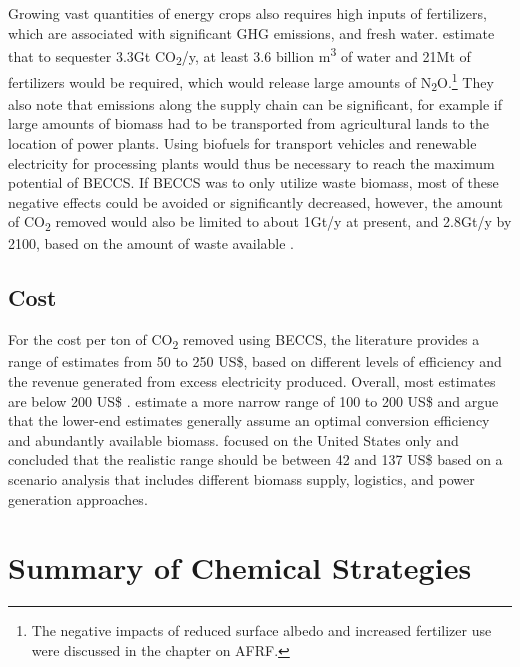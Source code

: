 Growing vast quantities of energy crops also requires high inputs of fertilizers, which are associated with significant GHG emissions, and fresh water. \textcite{Fajardy2017CanEmissions} estimate that to sequester 3.3Gt CO\textsubscript{2}/y, at least 3.6 billion m\textsuperscript{3} of water and 21Mt of fertilizers would be required, which would release large amounts of N\textsubscript{2}O.\footnote{The negative impacts of reduced surface albedo and increased fertilizer use were discussed in the chapter on AFRF.} They also note that emissions along the supply chain can be significant, for example if large amounts of biomass had to be transported from agricultural lands to the location of power plants. Using biofuels for transport vehicles and renewable electricity for processing plants would thus be necessary to reach the maximum potential of BECCS.
If BECCS was to only utilize waste biomass, most of these negative effects could be avoided or significantly decreased, however, the amount of CO\textsubscript{2} removed would also be limited to about 1Gt/y at present, and 2.8Gt/y by 2100, based on the amount of waste available \parencite{Pour2018PotentialBECCS}.
\subsection*{Cost}
For the cost per ton of CO\textsubscript{2} removed using BECCS, the literature provides a range of estimates from 50 to 250 US\$, based on different levels of efficiency and the revenue generated from excess electricity produced. Overall, most estimates are below 200 US\$ \parencite[343]{IPCC2018Global1.5C}. \textcite{Fuss2018NegativeEffects} estimate a more narrow range of 100 to 200 US\$ and argue that the lower-end estimates generally assume an optimal conversion efficiency and abundantly available biomass. \textcite{Langholtz2020TheUS} focused on the United States only and concluded that the realistic range should be between 42 and 137 US\$ based on a scenario analysis that includes different biomass supply, logistics, and power generation approaches.

\section{Summary of Chemical Strategies}